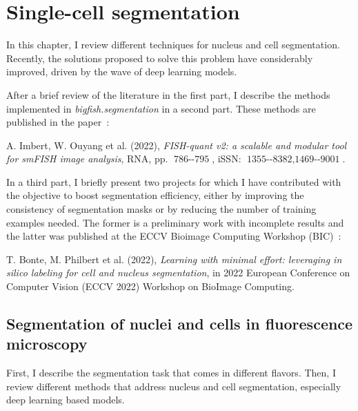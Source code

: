 
\graphicspath{{./figures/chapter3/}}

\chapter{Single-cell segmentation}
\label{ch:chapter3}


\newpage
\minitoc
\newpage

In this chapter, I review different techniques for nucleus and cell segmentation.
Recently, the solutions proposed to solve this problem have considerably improved, driven by the wave of deep learning models.

After a brief review of the literature in the first part, I describe the methods implemented in \emph{bigfish.segmentation} in a second part.
These methods are published in the paper~\cite{Imbert_fq_2022}:

\begin{center}
	\color{green}
	A. Imbert, W. Ouyang et al. (2022), \textit{FISH-quant v2: a scalable and modular tool for smFISH image analysis}, RNA, pp. $\operatorname{786--795}$, iSSN: $\operatorname{1355--8382, 1469--9001}$.
\end{center}

In a third part, I briefly present two projects for which I have contributed with the objective to boost segmentation efficiency, either by improving the consistency of segmentation masks or by reducing the number of training examples needed.
The former is a preliminary work with incomplete results and the latter was published at the ECCV Bioimage Computing Workshop (BIC)~\cite{Bonte_2022}:

\begin{center}
	\color{green}
	T. Bonte, M. Philbert et al. (2022), \textit{Learning with minimal effort: leveraging in silico labeling for cell and nucleus segmentation}, in 2022 European Conference on Computer Vision (ECCV 2022) Workshop on BioImage Computing.
\end{center}

\section{Segmentation of nuclei and cells in fluorescence microscopy}
\label{sec:segmentation_introduction}

First, I describe the segmentation task that comes in different flavors.
Then, I review different methods that address nucleus and cell segmentation, especially deep learning based models.

